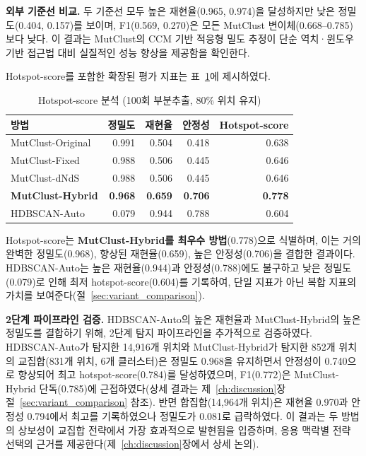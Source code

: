 \textbf{외부 기준선 비교.}
두 기준선 모두 높은 재현율(0.965, 0.974)을 달성하지만 낮은 정밀도(0.404, 0.157)를 보이며, F1(0.569, 0.270)은 모든 MutClust 변이체(0.668--0.785)보다 낮다.
이 결과는 MutClust의 CCM 기반 적응형 밀도 추정이 단순 역치·윈도우 기반 접근법 대비 실질적인 성능 향상을 제공함을 확인한다.

Hotspot-score를 포함한 확장된 평가 지표는 표~\ref{tab:hotspot_scores}에 제시하였다.

\begin{table}[htbp]
\centering
\caption{Hotspot-score 분석 (100회 부분추출, 80\% 위치 유지)}
\label{tab:hotspot_scores}
\begin{tabular}{lrrrr}
\toprule
\textbf{방법} & \textbf{정밀도} & \textbf{재현율} & \textbf{안정성} & \textbf{Hotspot-score} \\
\midrule
MutClust-Original & 0.991 & 0.504 & 0.418 & 0.638 \\
MutClust-Fixed & 0.988 & 0.506 & 0.445 & 0.646 \\
MutClust-dNdS & 0.988 & 0.506 & 0.445 & 0.646 \\
\textbf{MutClust-Hybrid} & \textbf{0.968} & \textbf{0.659} & \textbf{0.706} & \textbf{0.778} \\
HDBSCAN-Auto & 0.079 & 0.944 & 0.788 & 0.604 \\
\bottomrule
\end{tabular}
\end{table}

Hotspot-score는 \textbf{MutClust-Hybrid를 최우수 방법}(0.778)으로 식별하며, 이는 거의 완벽한 정밀도(0.968), 향상된 재현율(0.659), 높은 안정성(0.706)을 결합한 결과이다.
HDBSCAN-Auto는 높은 재현율(0.944)과 안정성(0.788)에도 불구하고 낮은 정밀도(0.079)로 인해 최저 hotspot-score(0.604)를 기록하여, 단일 지표가 아닌 복합 지표의 가치를 보여준다(절~\ref{sec:variant_comparison}).

\textbf{2단계 파이프라인 검증.}
HDBSCAN-Auto의 높은 재현율과 MutClust-Hybrid의 높은 정밀도를 결합하기 위해, 2단계 탐지 파이프라인을 추가적으로 검증하였다.
HDBSCAN-Auto가 탐지한 14,916개 위치와 MutClust-Hybrid가 탐지한 852개 위치의 교집합(831개 위치, 6개 클러스터)은 정밀도 0.968을 유지하면서 안정성이 0.740으로 향상되어 최고 hotspot-score(0.784)를 달성하였으며, F1(0.772)은 MutClust-Hybrid 단독(0.785)에 근접하였다(상세 결과는 제~\ref{ch:discussion}장 절~\ref{sec:variant_comparison} 참조).
반면 합집합(14,964개 위치)은 재현율 0.970과 안정성 0.794에서 최고를 기록하였으나 정밀도가 0.081로 급락하였다.
이 결과는 두 방법의 상보성이 교집합 전략에서 가장 효과적으로 발현됨을 입증하며, 응용 맥락별 전략 선택의 근거를 제공한다(제~\ref{ch:discussion}장에서 상세 논의).

